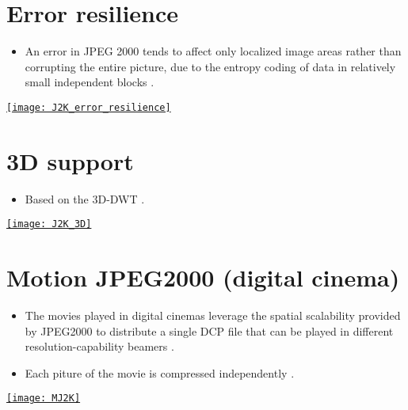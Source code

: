 \section{Error resilience}
\begin{itemize}
\item An error in JPEG 2000 tends to affect only localized image areas
  rather than corrupting the entire picture, due to the entropy coding
  of data in relatively small independent blocks
  \cite{wikipedia_J2K,brahimi2021efficient}.
\end{itemize}
\vspace{-2ex}
\begin{center}
  \href{https://flylib.com/books/en/2.537.1.37/1}{\texttt{[image: J2K\_error\_resilience]}}
\end{center}

\section{3D support}
\begin{itemize}
\item Based on the 3D-DWT \cite{Bruylants_J2K_3D}.
\end{itemize}
\vspace{-2ex}
\begin{center}
  \href{https://spie.org/images/Graphics/Newsroom/Imported/0779/0779_fig1.jpg}{\texttt{[image: J2K\_3D]}}
\end{center}

\section{Motion JPEG2000 (digital cinema)}
\begin{itemize}
\item The movies played in digital cinemas leverage the spatial
  scalability provided by JPEG2000 to distribute a single DCP file
  that can be played in different resolution-capability beamers
  \cite{wikipedia_DCP}.
\item Each piture of the movie is compressed independently
  \cite{DigitalCinema}.
\end{itemize}
\begin{center}
  \href{https://vicente-gonzalez-ruiz.github.io/JPEG2000/}{\texttt{[image: MJ2K]}}
\end{center}

